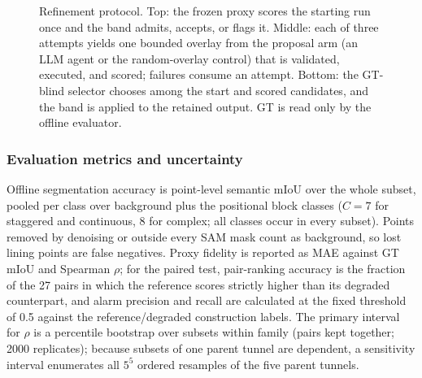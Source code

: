 \documentclass[a4paper,fleqn]{cas-dc}
\begin{document}
\begin{figure}[t]
{}
\caption{Refinement protocol. Top: the frozen proxy scores the starting run once and the band admits, accepts, or flags it. Middle: each of three attempts yields one bounded overlay from the proposal arm (an LLM agent or the random-overlay control) that is validated, executed, and scored; failures consume an attempt. Bottom: the GT-blind selector chooses among the start and scored candidates, and the band is applied to the retained output. GT is read only by the offline evaluator.}
\label{fig:verification}
\end{figure}

\subsubsection{Evaluation metrics and uncertainty}
\label{sec:metrics}

Offline segmentation accuracy is point-level semantic mIoU over the whole subset, pooled per class over background plus the positional block classes ($C=7$ for staggered and continuous, $8$ for complex; all classes occur in every subset). Points removed by denoising or outside every SAM mask count as background, so lost lining points are false negatives. Proxy fidelity is reported as MAE against GT mIoU and Spearman $\rho$; for the paired test, pair-ranking accuracy is the fraction of the 27 pairs in which the reference scores strictly higher than its degraded counterpart, and alarm precision and recall are calculated at the fixed threshold of 0.5 against the reference/degraded construction labels. The primary interval for $\rho$ is a percentile bootstrap over subsets within family (pairs kept together; 2000 replicates); because subsets of one parent tunnel are dependent, a sensitivity interval enumerates all $5^5$ ordered resamples of the five parent tunnels.
\end{document}
